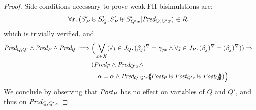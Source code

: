 \documentclass{lmcs}
\begin{document}
\begin{proof}
Side conditions necessary to prove weak-FH bisimulations are:
\[\forall x.\, (S'_P\uplus S'_Q,S'_P\uplus S'_{Q' x}| \Pred_{Q,Q' x})\in\mathcal{R}\]
which is trivially verified, and
\begin{equation*}
\begin{split}
\Pred_{Q,Q'}\land \Pred_P\land \Pred_Q \implies &
\Big(\bigvee_{x\in X}
(\forall j\in J_Q.\, \vis{\beta_j}=\gamma_{j x}\land \forall j\in J_P.\, \vis{\beta_j}=\vis{\beta_j}))\Rightarrow\\
& (\Pred_P\land \Pred_{Q' x}\land\\ &\quad\alpha=\alpha \land \Pred_{Q,Q' x}\subst{\Post_P\uplus\Post_{Q' x}\uplus \Post_{Q}}) \Big)
\end{split}
\end{equation*}
We conclude by observing that $\Post_P$ has no effect on variables of $Q$ and $Q'$, and thus on $\Pred_{Q,Q' x}$
%
%
%
%
%
%
%
%
 \end{proof}
\end{document}
